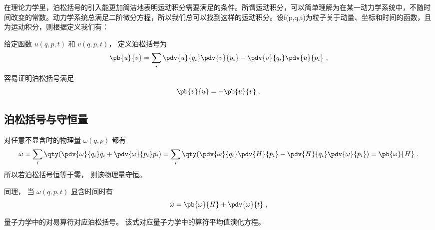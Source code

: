 
\begin{issues}
\issueDraft
\end{issues}

在理论力学里，泊松括号的引入能更加简洁地表明运动积分需要满足的条件。所谓运动积分，可以简单理解为在某一动力学系统中，不随时间改变的常数。动力学系统总满足二阶微分方程，所以我们总可以找到这样的运动积分。设f(p,q,t)为粒子关于动量、坐标和时间的函数，且为运动积分，则根据定义我们有：


给定函数 $u(q, p, t)$ 和 $v(q, p, t)$， 定义泊松括号为
\begin{equation}
\pb{u}{v} = \sum_i \pdv{u}{q_i}\pdv{v}{p_i} - \pdv{v}{q_i}\pdv{u}{p_i}~,
\end{equation}
容易证明泊松括号满足
\begin{equation}
\pb{v}{u} = -\pb{u}{v}~.
\end{equation}

\subsection{泊松括号与守恒量}
对任意不显含时的物理量 $\omega (q,p)$ 都有
\begin{equation}\label{eq_poison_1}
\dot \omega  = \sum_i \qty(\pdv{\omega}{q_i} \dot q_i + \pdv{\omega}{p_i} \dot p_i)
= \sum_i \qty(\pdv{\omega}{q_i} \pdv{H}{p_i} - \pdv{H}{q_i} \pdv{\omega}{p_i})
= \pb{\omega}{H} ~.
\end{equation}
所以若泊松括号恒等于零， 则该物理量守恒。

同理， 当 $\omega (q,p,t)$ 显含时间时有
\begin{equation}
\dot \omega  =  \pb{\omega}{H}  + \pdv{\omega}{t}~,
\end{equation}

量子力学中的对易算符对应泊松括号。 该式对应量子力学中的算符平均值演化方程。 %
